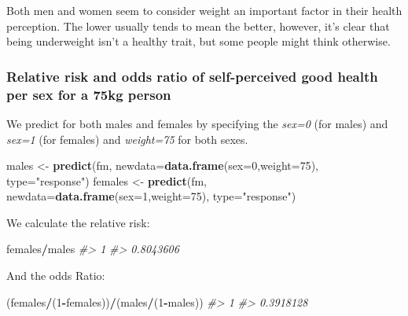 \documentclass[]{article}
\newenvironment{Shaded}{\begin{snugshade}}{\end{snugshade}}
\newcommand{\CommentTok}[1]{\textcolor[rgb]{0.56,0.35,0.01}{\textit{#1}}}
\newcommand{\DataTypeTok}[1]{\textcolor[rgb]{0.13,0.29,0.53}{#1}}
\newcommand{\DecValTok}[1]{\textcolor[rgb]{0.00,0.00,0.81}{#1}}
\newcommand{\KeywordTok}[1]{\textcolor[rgb]{0.13,0.29,0.53}{\textbf{#1}}}
\newcommand{\NormalTok}[1]{#1}
\newcommand{\OperatorTok}[1]{\textcolor[rgb]{0.81,0.36,0.00}{\textbf{#1}}}
\newcommand{\StringTok}[1]{\textcolor[rgb]{0.31,0.60,0.02}{#1}}
\begin{document}
Both men and women seem to consider weight an important factor in their
health perception. The lower usually tends to mean the better, however,
it's clear that being underweight isn't a healthy trait, but some people
might think otherwise.

\newpage

\hypertarget{relative-risk-and-odds-ratio-of-self-perceived-good-health-per-sex-for-a-75kg-person}{%
\subsubsection{Relative risk and odds ratio of self-perceived good
health per sex for a 75kg
person}\label{relative-risk-and-odds-ratio-of-self-perceived-good-health-per-sex-for-a-75kg-person}}

We predict for both males and females by specifying the \emph{sex=0}
(for males) and \emph{sex=1} (for females) and \emph{weight=75} for both
sexes.

\begin{Shaded}
\begin{Highlighting}[]
\NormalTok{males <-}\StringTok{ }\KeywordTok{predict}\NormalTok{(fm, }\DataTypeTok{newdata=}\KeywordTok{data.frame}\NormalTok{(}\DataTypeTok{sex=}\DecValTok{0}\NormalTok{,}\DataTypeTok{weight=}\DecValTok{75}\NormalTok{), }\DataTypeTok{type=}\StringTok{"response"}\NormalTok{)}
\NormalTok{females <-}\StringTok{ }\KeywordTok{predict}\NormalTok{(fm, }\DataTypeTok{newdata=}\KeywordTok{data.frame}\NormalTok{(}\DataTypeTok{sex=}\DecValTok{1}\NormalTok{,}\DataTypeTok{weight=}\DecValTok{75}\NormalTok{), }\DataTypeTok{type=}\StringTok{"response"}\NormalTok{)}
\end{Highlighting}
\end{Shaded}

We calculate the relative risk:

\begin{Shaded}
\begin{Highlighting}[]
\NormalTok{females}\OperatorTok{/}\NormalTok{males}
\CommentTok{#>         1 }
\CommentTok{#> 0.8043606}
\end{Highlighting}
\end{Shaded}

And the odds Ratio:

\begin{Shaded}
\begin{Highlighting}[]
\NormalTok{(females}\OperatorTok{/}\NormalTok{(}\DecValTok{1}\OperatorTok{-}\NormalTok{females))}\OperatorTok{/}\NormalTok{(males}\OperatorTok{/}\NormalTok{(}\DecValTok{1}\OperatorTok{-}\NormalTok{males))}
\CommentTok{#>         1 }
\CommentTok{#> 0.3918128}
\end{Highlighting}
\end{Shaded}
\end{document}
